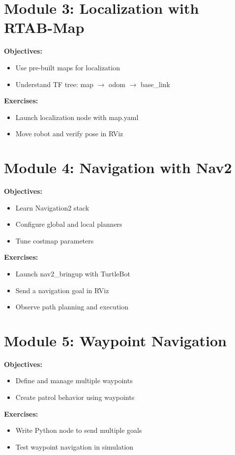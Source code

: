 \documentclass{article}
\begin{document}
\section{Module 3: Localization with RTAB-Map}
\textbf{Objectives:}
\begin{itemize}
  \item Use pre-built maps for localization
  \item Understand TF tree: map $\rightarrow$ odom $\rightarrow$ base\_link
\end{itemize}
\textbf{Exercises:}
\begin{itemize}
  \item Launch localization node with map.yaml
  \item Move robot and verify pose in RViz
\end{itemize}

\section{Module 4: Navigation with Nav2}
\textbf{Objectives:}
\begin{itemize}
  \item Learn Navigation2 stack
  \item Configure global and local planners
  \item Tune costmap parameters
\end{itemize}
\textbf{Exercises:}
\begin{itemize}
  \item Launch nav2\_bringup with TurtleBot
  \item Send a navigation goal in RViz
  \item Observe path planning and execution
\end{itemize}

\section{Module 5: Waypoint Navigation}
\textbf{Objectives:}
\begin{itemize}
  \item Define and manage multiple waypoints
  \item Create patrol behavior using waypoints
\end{itemize}
\textbf{Exercises:}
\begin{itemize}
  \item Write Python node to send multiple goals
  \item Test waypoint navigation in simulation
\end{itemize}
\end{document}
